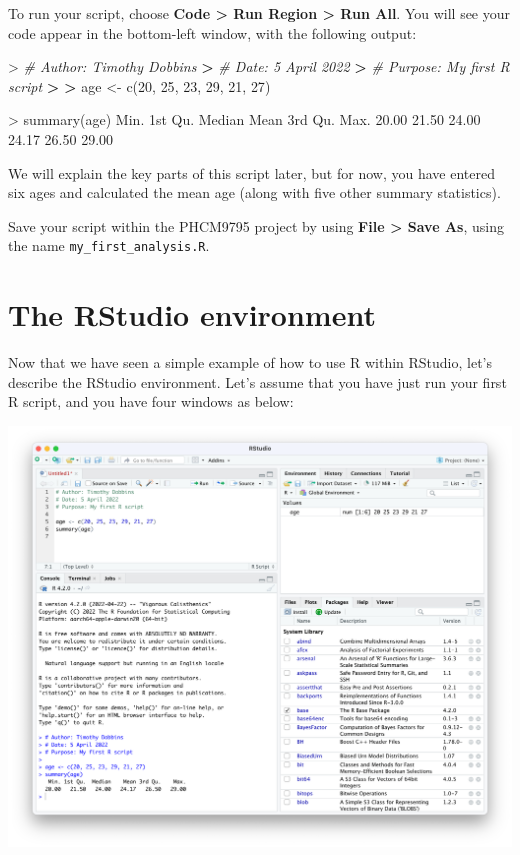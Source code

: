\documentclass[
]{memoir}
\newenvironment{Shaded}{\begin{snugshade}}{\end{snugshade}}
\newcommand{\CommentTok}[1]{\textcolor[rgb]{0.56,0.35,0.01}{\textit{#1}}}
\newcommand{\DecValTok}[1]{\textcolor[rgb]{0.00,0.00,0.81}{#1}}
\newcommand{\ErrorTok}[1]{\textcolor[rgb]{0.64,0.00,0.00}{\textbf{#1}}}
\newcommand{\FloatTok}[1]{\textcolor[rgb]{0.00,0.00,0.81}{#1}}
\newcommand{\FunctionTok}[1]{\textcolor[rgb]{0.00,0.00,0.00}{#1}}
\newcommand{\NormalTok}[1]{#1}
\newcommand{\OtherTok}[1]{\textcolor[rgb]{0.56,0.35,0.01}{#1}}
\newcommand{\SpecialCharTok}[1]{\textcolor[rgb]{0.00,0.00,0.00}{#1}}
\begin{document}
To run your script, choose \textbf{Code \textgreater{} Run Region \textgreater{} Run All}. You will see your code appear in the bottom-left window, with the following output:

\begin{Shaded}
\begin{Highlighting}[]
\SpecialCharTok{\textgreater{}} \CommentTok{\# Author: Timothy Dobbins}
\ErrorTok{\textgreater{}} \CommentTok{\# Date: 5 April 2022}
\ErrorTok{\textgreater{}} \CommentTok{\# Purpose: My first R script}
\ErrorTok{\textgreater{}} 
\ErrorTok{\textgreater{}}\NormalTok{ age }\OtherTok{\textless{}{-}} \FunctionTok{c}\NormalTok{(}\DecValTok{20}\NormalTok{, }\DecValTok{25}\NormalTok{, }\DecValTok{23}\NormalTok{, }\DecValTok{29}\NormalTok{, }\DecValTok{21}\NormalTok{, }\DecValTok{27}\NormalTok{)}

\SpecialCharTok{\textgreater{}} \FunctionTok{summary}\NormalTok{(age)}
\NormalTok{   Min. 1st Qu.  Median    Mean 3rd Qu.    Max. }
  \FloatTok{20.00}   \FloatTok{21.50}   \FloatTok{24.00}   \FloatTok{24.17}   \FloatTok{26.50}   \FloatTok{29.00} 
\end{Highlighting}
\end{Shaded}

We will explain the key parts of this script later, but for now, you have entered six ages and calculated the mean age (along with five other summary statistics).

Save your script within the PHCM9795 project by using \textbf{File \textgreater{} Save As}, using the name \texttt{my\_first\_analysis.R}.

\hypertarget{the-rstudio-environment}{%
\section{The RStudio environment}\label{the-rstudio-environment}}

Now that we have seen a simple example of how to use R within RStudio, let's describe the RStudio environment. Let's assume that you have just run your first R script, and you have four windows as below:

\includegraphics[width=1\linewidth]{img/RStudio-screenshot-03}
\end{document}
